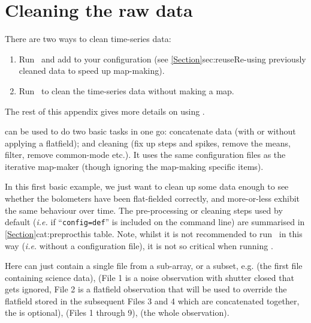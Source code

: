\chapter{Cleaning the raw data}
\label{app:clean}

There are two ways to clean time-series data:

\begin{enumerate}
\item Run \makemap\ and add  to your
configuration (see \cref{Section}{sec:reuse}{Re-using previously cleaned
data to speed up map-making}).
\item Run \clean\ to clean the time-series data without making a map.
\end{enumerate}

The rest of this appendix gives more details on using \clean.

 can be used to do two basic tasks in one go:
concatenate data (with or without applying a flatfield); and cleaning
(fix up steps and spikes, remove the means, filter, remove common-mode
etc.). It uses the same configuration files as the iterative map-maker
(though ignoring the map-making specific items).

In this first basic example, we just want to clean up some data enough
to see whether the bolometers have been flat-fielded correctly, and
more-or-less exhibit the same behaviour over time. The pre-processing
or cleaning steps used by default (\emph{i.e.} if ``\texttt{config=def}''
is included on the command line) are summarised in
\cref{Section}{cat:preproc}{this table}. Note, whilst it is not
recommended to run \makemap\ in this way (\emph{i.e.} without a
configuration file), it is not so critical when running \clean.

\begin{terminalv}
\end{terminalv}

Here  can just contain a single file from a sub-array, or a
subset, e.g.  (the first file
containing science data),  (File
1 is a noise observation with shutter closed that gets ignored, File 2
is a flatfield observation that will be used to override the flatfield
stored in the subsequent Files 3 and 4 which are concatenated
together, the  is optional),
 (Files 1 through 9),
 (the whole observation).

